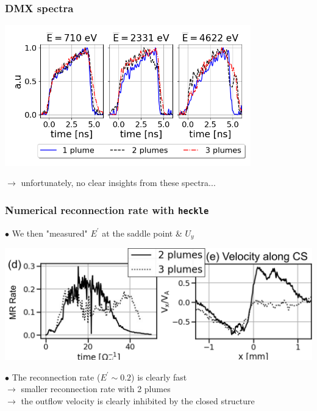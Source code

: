 \documentclass{beamer}
\begin{document}
\begin{frame}
\frametitle{DMX spectra}

\begin{center}
\includegraphics[width=0.8\textwidth]{fig_DMX.png}
\end{center}

$\to$ unfortunately, no clear insights from these spectra...

\end{frame}



\begin{frame}
\frametitle{Numerical reconnection rate with \texttt{heckle}}

$\bullet$ We then "measured" $E^{\prime}$ at the saddle point \& $U_y$ \\

\begin{center}
\includegraphics[width=1.0\textwidth]{recrate.png}
\end{center}

$\bullet$ The reconnection rate ($E^{\prime} \sim 0.2$) is clearly fast \\
$\to$ smaller reconnection rate with 2 plumes \\
$\to$ the outflow velocity is clearly inhibited by the closed structure \\

\end{frame}
\end{document}
